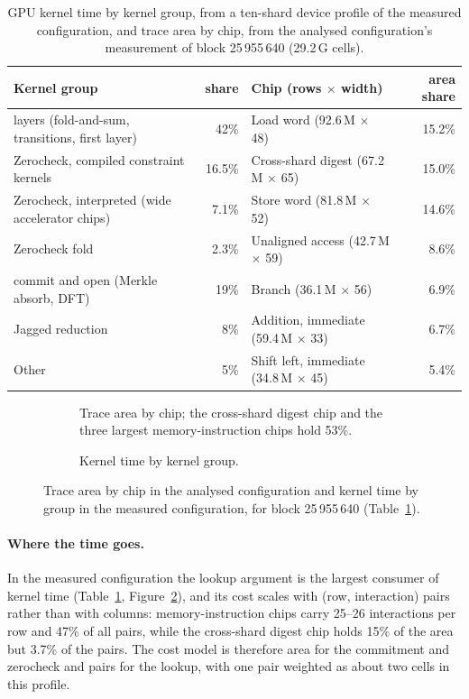 \begin{table}[t]
\centering
\caption{GPU kernel time by kernel group, from a ten-shard device profile of the measured configuration, and trace area by chip, from the analysed configuration's measurement of block 25\,955\,640 (29.2\,G cells).}
\label{tab:kernel-area}
\footnotesize\setlength{\tabcolsep}{4pt}
\begin{tabular}{p{}r@{\quad}p{}r}
\toprule
Kernel group & share & Chip (rows $\times$ width) & area share \\
\midrule
\LogUp{} layers (fold-and-sum, transitions, first layer) & 42\% & Load word (92.6\,M $\times$ 48) & 15.2\% \\
Zerocheck, compiled constraint kernels & 16.5\% & Cross-shard digest (67.2\,M $\times$ 65) & 15.0\% \\
Zerocheck, interpreted (wide accelerator chips) & 7.1\% & Store word (81.8\,M $\times$ 52) & 14.6\% \\
Zerocheck fold & 2.3\% & Unaligned access (42.7\,M $\times$ 59) & 8.6\% \\
\WHIR{} commit and open (Merkle absorb, DFT) & 19\% & Branch (36.1\,M $\times$ 56) & 6.9\% \\
Jagged reduction & 8\% & Addition, immediate (59.4\,M $\times$ 33) & 6.7\% \\
Other & 5\% & Shift left, immediate (34.8\,M $\times$ 45) & 5.4\% \\
\bottomrule
\end{tabular}
\end{table}

\begin{figure}[t]
\centering
\begin{subfigure}[t]{0.49\textwidth}\centering\caption{Trace area by chip; the cross-shard digest chip and the three largest memory-instruction chips hold 53\%.}\label{fig:area}\end{subfigure}\hfill
\begin{subfigure}[t]{0.49\textwidth}\centering\caption{Kernel time by kernel group.}\label{fig:kernel}\end{subfigure}
\caption{Trace area by chip in the analysed configuration and kernel time by group in the measured configuration, for block 25\,955\,640 (Table~\ref{tab:kernel-area}).}
\label{fig:profile}
\end{figure}

\paragraph{Where the time goes.} In the measured configuration the lookup argument is the largest consumer of kernel time (Table~\ref{tab:kernel-area}, Figure~\ref{fig:kernel}), and its cost scales with (row, interaction) pairs rather than with columns: memory-instruction chips carry 25--26 interactions per row and 47\% of all pairs, while the cross-shard digest chip holds 15\% of the area but 3.7\% of the pairs. The cost model is therefore area for the commitment and zerocheck and pairs for the lookup, with one pair weighted as about two cells in this profile.

